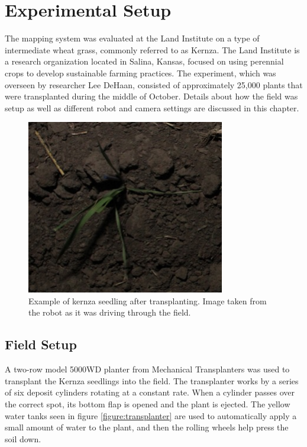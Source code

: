 
\cleardoublepage

\chapter{Experimental Setup}
\label{chapter:experiment}

The mapping system was evaluated at the Land Institute on a type of intermediate wheat grass, commonly referred to as Kernza.  The Land Institute is a research organization located in Salina, Kansas, focused on using perennial crops to develop sustainable farming practices.  The experiment, which was overseen by researcher Lee DeHaan, consisted of approximately 25,000 plants that were transplanted during the middle of October.  Details about how the field was setup as well as different robot and camera settings are discussed in this chapter. 

\begin{figure}
	\centering
    \includegraphics[height=3in]{figures/kernza_example.jpg}
    \caption[Kernza seedling]{Example of kernza seedling after transplanting. Image taken from the robot as it was driving through the field.}
    \label{figure:kernza_example}
\end{figure}

\section{Field Setup}
\label{section:field_setup}

A two-row model 5000WD planter from Mechanical Transplanters was used to transplant the Kernza seedlings into the field.  The transplanter works by a series of six deposit cylinders rotating at a constant rate.  When a cylinder passes over the correct spot, its bottom flap is opened and the plant is ejected.  The yellow water tanks seen in figure \ref{figure:transplanter} are used to automatically apply a small amount of water to the plant, and then the rolling wheels help press the soil down.  

